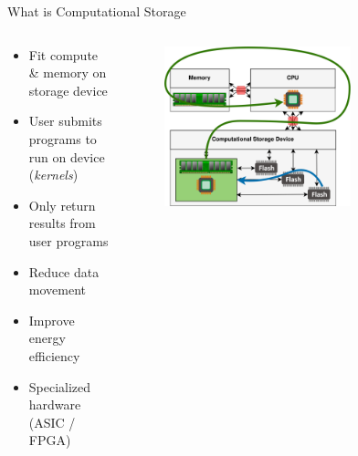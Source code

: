 \documentclass[aspectratio=169, notes]{beamer}
\begin{document}
\begin{frame}{What is Computational Storage}
    \begin{columns}
        \begin{column}{0.35\textwidth}
            \footnotesize
            \begin{itemize}
                \item Fit compute \& memory on storage device
                \item User submits programs to run on device (\textit{kernels})
                \item Only return results from user programs
                \item Reduce data movement
                \item Improve energy efficiency
                \item Specialized hardware \\ (ASIC / FPGA)
            \end{itemize}
        \end{column}
        \begin{column}{0.65\textwidth}
            \begingroup
            \small
            \begin{figure}
                \centering
                \includegraphics[width=0.7\textwidth]{resources/images/csd.png}
            \end{figure}
            \endgroup
        \end{column}
    \end{columns}
\end{frame}
\end{document}
